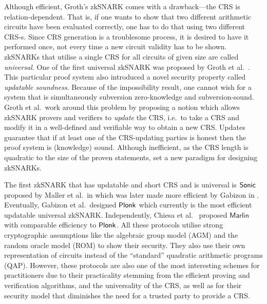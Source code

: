 \let\accentvec\vec \documentclass[runningheads,10pt]{llncs}
\begin{document}
Although efficient, Groth's zkSNARK comes with a drawback---the CRS is
relation-dependent. That is, if one wants to show that two different arithmetic circuits
have been evaluated correctly, one has to do that using two different CRS-s. 
Since CRS generation is a
troublesome process, it is desired to have it performed once, not every
time a new circuit validity has to be shown. zkSNARKs that utilise a single
CRS for all circuits of given size are called \emph{universal}. One of the first universal
zkSNARK was proposed by Groth et al.~\cite{C:GKMMM18}. This particular proof
system also introduced a novel security property called \emph{updatable
soundness}.
Because of the  \cite{AC:BelFucSca16} impossibility result, one cannot wish for a
system that is simultaneously subversion zero-knowledge and subversion-sound.
Groth et al.~work around this problem by proposing a notion which allows
zkSNARK provers and verifiers to \emph{update} the CRS, i.e.~to take a CRS and modify it
in a well-defined and verifiable way to obtain a new CRS. Updates guarantee 
that if at least one of the CRS-updating
parties is honest then the proof system is (knowledge) sound. Although inefficient, as the CRS length
is quadratic to the size of the proven statements, \cite{C:GKMMM18} set a new
paradigm for designing zkSNARKs.

The first zkSNARK that has updatable and short CRS and is universal is
${\textnormal{\textsf{Sonic}}}$ proposed by Maller et al.~in \cite{CCS:MBKM19} which was later
made more efficient by Gabizon in \cite{EPRINT:Gabizon19c}. Eventually, Gabizon et
al.~designed $\textnormal{\textsf{Plonk}}$ \cite{EPRINT:GabWilCio19} which currently is the
most efficient updatable universal zkSNARK. Independently, Chiesa et
al.~\cite{EC:CHMMVW20} proposed $\textsf{Marlin}$ with comparable efficiency to
$\textnormal{\textsf{Plonk}}$.
%
All these protocols utilise strong cryptographic assumptions like the
algebraic group model (AGM) and the random oracle model (ROM) to show their
security. They also use their own representation of circuits instead of the
``standard'' quadratic arithmetic programs (QAP). However, these protocols are also one of the  most interesting schemes
for practitioners due to their practicality stemming from the efficient
proving and verification algorithms, and the universality of the CRS, as well as for their
security model that diminishes the need for a trusted party to provide
a CRS.

\end{document}
